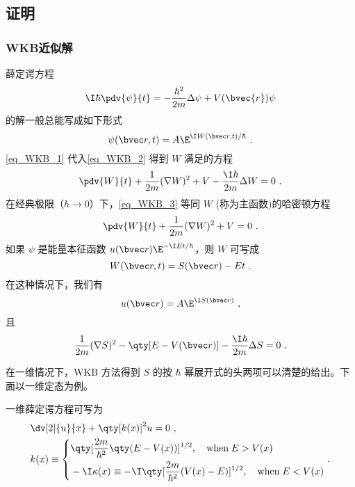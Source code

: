 \subsection{证明}
\subsubsection{WKB近似解}
薛定谔方程
\begin{equation}\label{eq_WKB_2}
\I\hbar\pdv{\psi}{t}=-\frac{\hbar^2}{2m}\Delta\psi+V(\bvec{r})\psi
\end{equation}
的解一般总能写成如下形式
\begin{equation}\label{eq_WKB_1}
\psi(\bvec r,t)=A\E^{\I W(\bvec r,t)/\hbar}~.
\end{equation}
\autoref{eq_WKB_1} 代入\autoref{eq_WKB_2} 得到 $W$ 满足的方程
\begin{equation}\label{eq_WKB_3}
\pdv{W}{t}+\frac{1}{2m}(\nabla W)^2+V-\frac{\I\hbar}{2m}\Delta W=0~.
\end{equation}
在经典极限（$\hbar\rightarrow 0$）下，\autoref{eq_WKB_3} 等同 $W$ (称为主函数)的哈密顿方程
\begin{equation}
\pdv{W}{t}+\frac{1}{2m}(\nabla W)^2+V=0~.
\end{equation}
如果 $\psi$ 是能量本征函数 $u(\bvec r)\E^{-\I Et/\hbar}$，则 $W$ 可写成
\begin{equation}
W(\bvec r,t)=S(\bvec r)-Et~.
\end{equation}
在这种情况下，我们有
\begin{equation}
u(\bvec r)=A\E^{\I S(\bvec r)}~,
\end{equation}
且
\begin{equation}
\frac{1}{2m}(\nabla S)^2-\qty[E-V(\bvec r)]-\frac{\I\hbar}{2m}\Delta S=0~.
\end{equation}

在一维情况下，WKB 方法得到 $S$ 的按 $\hbar$ 幂展开式的头两项可以清楚的给出。下面以一维定态为例。

一维薛定谔方程可写为\cite{Sakurai}
\begin{equation}\label{eq_WKB_4}
\begin{aligned}
&\dv[2]{u}{x}+\qty[k(x)]^2u=0~,\\
&k(x)\equiv\left\{\begin{aligned}
&\qty[\frac{2m}{\hbar^2}\qty(E-V(x))]^{1/2},\quad \text{when}\; E>V(x)\\
&-\I\kappa(x)\equiv-\I\qty[\frac{2m}{\hbar^2}(V(x)-E)]^{1/2},\quad \text{when}\; E<V(x)
\end{aligned}~.\right.
\end{aligned}
\end{equation}

